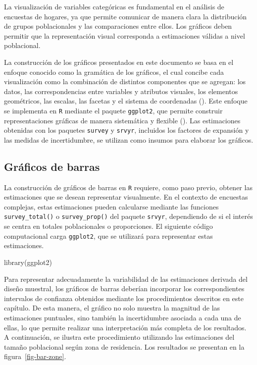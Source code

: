 \documentclass[
  spanish,
  11pt,
  letterpaper,
  oneside,
  open=any]{scrbook}
\newenvironment{Shaded}{\begin{snugshade}}{\end{snugshade}}
\newcommand{\FunctionTok}[1]{\textcolor[rgb]{0.28,0.35,0.67}{#1}}
\newcommand{\NormalTok}[1]{\textcolor[rgb]{0.00,0.23,0.31}{#1}}
\begin{document}
La visualización de variables categóricas es fundamental en el análisis
de encuestas de hogares, ya que permite comunicar de manera clara la
distribución de grupos poblacionales y las comparaciones entre ellos.
Los gráficos deben permitir que la representación visual corresponda a
estimaciones válidas a nivel poblacional.

La construcción de los gráficos presentados en este documento se basa en
el enfoque conocido como la gramática de los gráficos, el cual concibe
cada visualización como la combinación de distintos componentes que se
agregan: los datos, las correspondencias entre variables y atributos
visuales, los elementos geométricos, las escalas, las facetas y el
sistema de coordenadas (). Este enfoque se implementa en \texttt{R} mediante el paquete
\texttt{ggplot2}, que permite construir representaciones gráficas de
manera sistemática y flexible (). Las estimaciones obtenidas con los paquetes
\texttt{survey} y \texttt{srvyr}, incluidos los factores de expansión y
las medidas de incertidumbre, se utilizan como insumos para elaborar los
gráficos.

\subsection{Gráficos de barras}\label{graficos-de-barras}

La construcción de gráficos de barras en \texttt{R} requiere, como paso
previo, obtener las estimaciones que se desean representar visualmente.
En el contexto de encuestas complejas, estas estimaciones pueden
calcularse mediante las funciones \texttt{survey\_total()} o
\texttt{survey\_prop()} del paquete \texttt{srvyr}, dependiendo de si el
interés se centra en totales poblacionales o proporciones. El siguiente
código computacional carga \texttt{ggplot2}, que se utilizará para
representar estas estimaciones.

\begin{Shaded}
\begin{Highlighting}[]
\FunctionTok{library}\NormalTok{(ggplot2)}
\end{Highlighting}
\end{Shaded}

Para representar adecuadamente la variabilidad de las estimaciones
derivada del diseño muestral, los gráficos de barras deberían incorporar
los correspondientes intervalos de confianza obtenidos mediante los
procedimientos descritos en este capítulo. De esta manera, el gráfico no
solo muestra la magnitud de las estimaciones puntuales, sino también la
incertidumbre asociada a cada una de ellas, lo que permite realizar una
interpretación más completa de los resultados. A continuación, se
ilustra este procedimiento utilizando las estimaciones del tamaño
poblacional según zona de residencia. Los resultados se presentan en la
figura~\ref{fig-bar-zone}.
\end{document}
